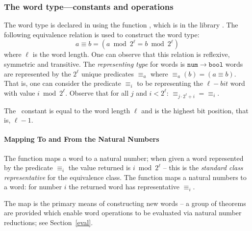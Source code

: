 {%


\subsubsection{The word type---constants and operations} \label{type}

The word type is declared in \HOL{} using the function
, which is in the library
.  The following equivalence relation is used to
construct the word type:
\[ a \equiv b = (a \bmod 2^\ell = b \bmod 2^\ell) \]
where $\ell$ is the word length.  One can observe that this relation
is reflexive, symmetric and transitive.  The \emph{representing type}
for words is $\mathtt{num}\rightarrow\mathtt{bool}$ \ie{} words are
represented by the $2^\ell$ unique predicates ${\equiv_a}$ where
${\equiv_a}(b) = (a \equiv b)$.  That is, one can consider the
predicate ${\equiv_i}$ to be representing the $\ell-bit$ word with
value $i \bmod 2^\ell$.  Observe that for all $j$ and $i < 2^\ell$:
${\equiv_{j\cdot 2^\ell + i}} = {\equiv_i}$.

The \HOL\ constant  is equal to the word length $\ell$ and
 is the highest bit position, that is, $\ell - 1$.

\paragraph{Mapping To and From the Natural Numbers}

The function  maps a word to a natural number; when given a
word represented by the predicate ${\equiv_i}$ the value returned is
$i \bmod 2^\ell$ -- this is the \emph{standard class representative}
for the equivalence class.  The function  maps a natural
numbers to a word: for number $i$ the returned word has representative
${\equiv_i}$.

The map  is the primary means of constructing new words -- a
group of theorems are provided which enable word operations to be
evaluated via natural number reductions; see Section~\ref{eval}.

}
